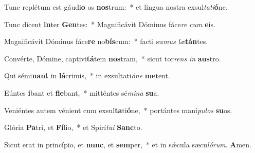Tunc replétum est gáudi\textbf{o} os \textbf{nos}trum:~* et lingua nostra exsul\textit{ta}\textit{ti}\textbf{ó}ne.

Tunc dicent \textbf{in}ter \textbf{Gen}tes:~* Magnificávit Dóminus fáce\textit{re} \textit{cum} \textbf{e}is.

Magnificávit Dóminus fáce\textbf{re} no\textbf{bís}cum:~* facti su\textit{mus} \textit{læ}\textbf{tán}tes.

Convérte, Dómine, captivi\textbf{tá}tem \textbf{nos}tram,~* sicut tor\textit{rens} \textit{in} \textbf{aus}tro.

Qui sémi\textbf{nant} in \textbf{lá}crimis,~* in exsultati\textit{ó}\textit{ne} \textbf{me}tent.

Eúntes \textbf{i}bant et \textbf{fle}bant,~* mitténtes sé\textit{mi}\textit{na} \textbf{su}a.

Veniéntes autem vénient cum exsul\textbf{ta}ti\textbf{ó}ne,~* portántes maní\textit{pu}\textit{los} \textbf{su}os.

Glória \textbf{Pa}tri, et \textbf{Fí}lio,~* et Spirí\textit{tu}\textit{i} \textbf{Sanc}to.

Sicut erat in princípio, et \textbf{nunc}, et \textbf{sem}per,~* et in sǽcula sæcu\textit{ló}\textit{rum}. \textbf{A}men.


